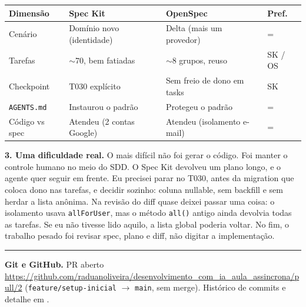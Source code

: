 \documentclass[12pt,a4paper]{article}
\begin{document}
{\footnotesize
\setlength{\tabcolsep}{3pt}
\begin{tabular}{@{}>{\raggedright\arraybackslash}p{2.4cm}>{\raggedright\arraybackslash}p{3.6cm}>{\raggedright\arraybackslash}p{3.6cm}>{\centering\arraybackslash}p{1.5cm}@{}}
\toprule
Dimensão & Spec Kit & OpenSpec & Pref. \\
\midrule
Cenário & Domínio novo (identidade) & Delta (mais um provedor) & = \\
Tarefas & $\sim$70, bem fatiadas & $\sim$8 grupos, reuso & SK / OS \\
Checkpoint & T030 explícito & Sem freio de dono em tasks & SK \\
\texttt{AGENTS.md} & Instaurou o padrão & Protegeu o padrão & = \\
Código vs spec & Atendeu (2 contas Google) & Atendeu (isolamento e-mail) & = \\
\bottomrule
\end{tabular}
}

\textbf{3. Uma dificuldade real.} O mais difícil não foi gerar o código. Foi manter o controle humano no meio do SDD. O Spec Kit devolveu um plano longo, e o agente quer seguir em frente. Eu precisei parar no T030, antes da migration que coloca dono nas tarefas, e decidir sozinho: coluna nullable, sem backfill e sem herdar a lista anônima. Na revisão do diff quase deixei passar uma coisa: o isolamento usava \texttt{allForUser}, mas o método \texttt{all()} antigo ainda devolvia todas as tarefas. Se eu não tivesse lido aquilo, a lista global poderia voltar. No fim, o trabalho pesado foi revisar spec, plano e diff, não digitar a implementação.

\vspace{0.1em}
\hrule
\vspace{0.3em}

\textbf{Git e GitHub.} PR aberto \url{https://github.com/raduanoliveira/desenvolvimento_com_ia_aula_assincrona/pull/2} (\texttt{feature/setup-inicial} $\rightarrow$ \texttt{main}, sem merge). Histórico de commits e detalhe em .
\end{document}
